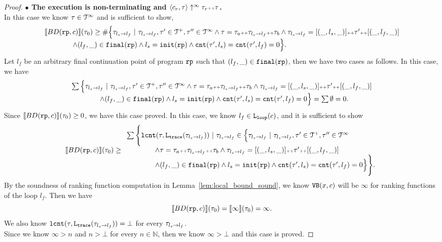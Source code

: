 \begin{proof}
\textbf{$\bullet$ The execution is non-terminating and {$\langle {c_r}, \mathtt{\tau} \rangle \uparrow^{\infty} \mathtt{\tau}_r {\scriptscriptstyle ++} \mathtt{\tau}$}.} 
\\
 In this case we know $\mathtt{\tau} \in \mathcal{T}^{\infty}$ and is sufficient to show,
 \[
  \begin{array}{l}
  \llbracket BD(\mathtt{rp}, c) \rrbracket(\mathtt{\tau}_0) \geq
  \# \Big\{\mathtt{\tau}_{l_s \to l_f} ~\vert~ \mathtt{\tau}_{l_s \to l_f}, \mathtt{\tau}'\in \mathcal{T}^{+}, \mathtt{\tau}''\in \mathcal{T}^{\infty}
  \land \mathtt{\tau} = \mathtt{\tau}_a {\scriptscriptstyle ++} \mathtt{\tau}_{l_s \to l_f} {\scriptscriptstyle ++} \mathtt{\tau}_b
  \land \mathtt{\tau}_{l_s \to l_f} = [(\_, l_s, \_)] {\scriptscriptstyle ++} \mathtt{\tau}' {\scriptscriptstyle ++} [(\_, l_f, \_)]
\\ \qquad \qquad
  \land (l_{f}, \_) \in \mathtt{final}(\mathtt{rp})
  \land l_s = \mathtt{init}(\mathtt{rp})
  \land \mathtt{cnt}(\mathtt{\tau}', l_s) = \mathtt{cnt}(\mathtt{\tau}', l_f) = 0 
  \Big\}.
  \end{array}
\]
Let $l_f$ be an arbitrary final continuation point of program $\mathtt{rp}$ such that $(l_{f}, \_) \in \mathtt{final}(\mathtt{rp})$,
then we have two cases as follows.
In this case, we have 
\[
  \begin{array}{l}
    \sum \Big\{\mathtt{\tau}_{l_s \to l_f} ~\vert~ \mathtt{\tau}_{l_s \to l_f}, \mathtt{\tau}'\in \mathcal{T}^{+}, \mathtt{\tau}''\in \mathcal{T}^{\infty}
    \land \mathtt{\tau} = \mathtt{\tau}_a {\scriptscriptstyle ++} \mathtt{\tau}_{l_s \to l_f} {\scriptscriptstyle ++} \mathtt{\tau}_b
    \land \mathtt{\tau}_{l_s \to l_f} = [(\_, l_s, \_)] {\scriptscriptstyle ++} \mathtt{\tau}' {\scriptscriptstyle ++} [(\_, l_f, \_)]
    \\ \qquad \qquad
  \land (l_{f}, \_) \in \mathtt{final}(\mathtt{rp})
  \land l_s = \mathtt{init}(\mathtt{rp})
  \land \mathtt{cnt}(\mathtt{\tau}', l_s) = \mathtt{cnt}(\mathtt{\tau}', l_f) = 0 
  \Big\} = \sum \emptyset = 0.
  \end{array}
\]
Since $ \llbracket BD(\mathtt{rp}, c) \rrbracket(\mathtt{\tau}_0) \geq 0$, we have this case proved.
In this case, we know $l_f \in \mathtt{L}_{\mathtt{loop}}(c)$, and  it is sufficient to show
\[
  \llbracket BD(\mathtt{rp}, c) \rrbracket(\mathtt{\tau}_0)
  \geq \begin{array}{l}
    \sum\Bigg\{
      \mathtt{lcnt}(\mathtt{\tau}, \mathtt{L}_{\mathtt{{trace}}}(\mathtt{\tau}_{l_s \to l_f})) ~\vert~ \mathtt{\tau}_{l_s \to l_f} \in 
    \Big\{\mathtt{\tau}_{l_s \to l_f} ~\vert~ \mathtt{\tau}_{l_s \to l_f}, \mathtt{\tau}'\in \mathcal{T}^{+}, \mathtt{\tau}''\in \mathcal{T}^{\infty}
    \\ \qquad \qquad
    \land \mathtt{\tau} = \mathtt{\tau}_a {\scriptscriptstyle ++} \mathtt{\tau}_{l_s \to l_f} {\scriptscriptstyle ++} \mathtt{\tau}_b
    \land \mathtt{\tau}_{l_s \to l_f} = [(\_, l_s, \_)] {\scriptscriptstyle ++} \mathtt{\tau}' {\scriptscriptstyle ++} [(\_, l_f, \_)]
    \\ \qquad \qquad
  \land (l_{f}, \_) \in \mathtt{final}(\mathtt{rp})
  \land l_s = \mathtt{init}(\mathtt{rp})
  \land \mathtt{cnt}(\mathtt{\tau}', l_s) = \mathtt{cnt}(\mathtt{\tau}', l_f) = 0 
  \Big\}
  \Bigg\}.
  \end{array}
\]
By the soundness of ranking function computation in Lemma~\ref{lem:local_bound_sound}, we know ${\mathtt{VB}}(x, c)$ will be $\infty$ for ranking functions of the loop $l_f$.
Then we have 
\[
  \llbracket BD(\mathtt{rp}, c) \rrbracket(\mathtt{\tau}_0) = \llbracket \infty \rrbracket(\mathtt{\tau}_0) = \infty.
\]
We also know $\mathtt{lcnt}(\mathtt{\tau}, \mathtt{L}_{\mathtt{{trace}}}(\mathtt{\tau}_{l_s \to l_f})) = \bot$ for every $\mathtt{\tau}_{l_s \to l_f}$.
\\
Since we know $\infty > n$ and $ n > \bot$ for every $n \in \mathbb{N}$, then we know  $\infty > \bot$ and this case is proved.
\end{proof}